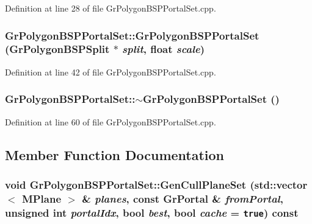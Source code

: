 Definition at line 28 of file GrPolygonBSPPortalSet.cpp.\hypertarget{class_gr_polygon_b_s_p_portal_set_e3a1f400a459229a3e8c77d6480cea86}{
\subsubsection[{GrPolygonBSPPortalSet}]{\setlength{\rightskip}{0pt plus 5cm}GrPolygonBSPPortalSet::GrPolygonBSPPortalSet ({\bf GrPolygonBSPSplit} $\ast$ {\em split}, \/  float {\em scale})}}
\label{class_gr_polygon_b_s_p_portal_set_e3a1f400a459229a3e8c77d6480cea86}




Definition at line 42 of file GrPolygonBSPPortalSet.cpp.\hypertarget{class_gr_polygon_b_s_p_portal_set_cf0bf0c229585ce6f1ffd51991c4f2a1}{
\subsubsection[{$\sim$GrPolygonBSPPortalSet}]{\setlength{\rightskip}{0pt plus 5cm}GrPolygonBSPPortalSet::$\sim$GrPolygonBSPPortalSet ()}}
\label{class_gr_polygon_b_s_p_portal_set_cf0bf0c229585ce6f1ffd51991c4f2a1}




Definition at line 60 of file GrPolygonBSPPortalSet.cpp.

\subsection{Member Function Documentation}
\hypertarget{class_gr_polygon_b_s_p_portal_set_d91efd1c01bb37833352a012336cca60}{
\subsubsection[{GenCullPlaneSet}]{\setlength{\rightskip}{0pt plus 5cm}void GrPolygonBSPPortalSet::GenCullPlaneSet (std::vector$<$ {\bf MPlane} $>$ \& {\em planes}, \/  const {\bf GrPortal} \& {\em fromPortal}, \/  unsigned int {\em portalIdx}, \/  bool {\em best}, \/  bool {\em cache} = {\tt true}) const}}
\label{class_gr_polygon_b_s_p_portal_set_d91efd1c01bb37833352a012336cca60}




